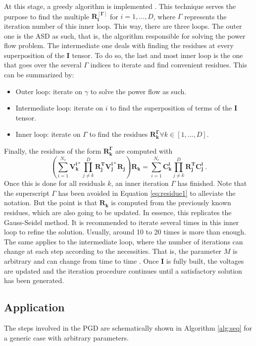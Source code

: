 At this stage, a greedy algorithm is implemented \cite{black2005greedy}. This technique serves the purpose to find the multiple $\bm{R_i^{[\Gamma]}}$ for $i=1,...,D$, where $\Gamma$ represents the iteration number of this inner loop. This way, there are three loops. The outer one is the ASD as such, that is, the algorithm responsible for solving the power flow problem. The intermediate one deals with finding the residues at every superposition of the $\bm{I}$ tensor. To do so, the last and most inner loop is the one that goes over the several $\Gamma$ indices to iterate and find convenient residues. This can be summarized by:
\begin{itemize}
	\item Outer loop: iterate on $\gamma$ to solve the power flow as such.
	\item Intermediate loop: iterate on $i$ to find the superposition of terms of the  $\bm{I}$ tensor.
	\item Inner loop: iterate on $\Gamma$ to find the residues $\bm{R_k^{\Gamma}}\forall k \in [1,...,D]$.
\end{itemize}

Finally, the residues of the form $\bm{R_k^{\Gamma}}$ are computed with
\begin{equation}
	\left(\sum_{i=1}^{N_v}\bm{V_k^{i*}}\prod_{j\neq k}^D \bm{R_j^TV_j^{i*}R_j}\right)\bm{R_k} = \sum_{i=1}^{N_c}\bm{C_k^i}\prod_{j\neq k}^D\bm{R_j^TC_j^i} \ .
\label{eq:residue1}
\end{equation}
Once this is done for all residuals $k$, an inner iteration $\Gamma$ has finished. Note that the superscript $\Gamma$ has been avoided in Equation \ref{eq:residue1} to alleviate the notation. But the point is that $\bm{R_k}$ is computed from the previously known residues, which are also going to be updated. In essence, this replicates the Gauss-Seidel method. It is recommended to iterate several times in this inner loop to refine the solution. Usually, around 10 to 20 times is more than enough. The same applies to the intermediate loop, where the number of iterations can change at each step according to the necessities. That is, the parameter $M$ is arbitrary and can change from time to time \cite{garcia2016reduced}. Once $\bm{I}$ is fully built, the voltages are updated and the iteration procedure continues until a satisfactory solution has been generated.

\subsection{Application}
The steps involved in the PGD are schematically shown in Algorithm \ref{alg:seq} for a generic case with arbitrary parameters.

